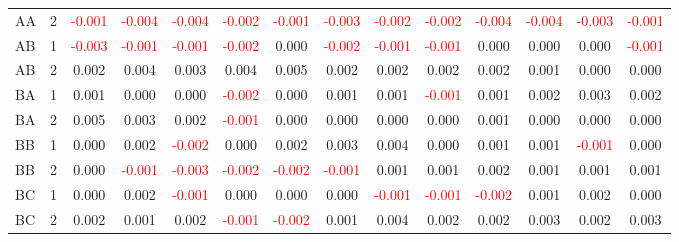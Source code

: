 \begin{table}[H]
{\begin{tabular}{llcccccccccccc}
AA & 2 & \textcolor{red}{-0.001} & \textcolor{red}{-0.004} & \textcolor{red}{-0.004} & \textcolor{red}{-0.002} & \textcolor{red}{-0.001} & \textcolor{red}{-0.003} & \textcolor{red}{-0.002} & \textcolor{red}{-0.002} & \textcolor{red}{-0.004} & \textcolor{red}{-0.004} & \textcolor{red}{-0.003} & \textcolor{red}{-0.001}\\
AB & 1 & \textcolor{red}{-0.003} & \textcolor{red}{-0.001} & \textcolor{red}{-0.001} & \textcolor{red}{-0.002} & 0.000 & \textcolor{red}{-0.002} & \textcolor{red}{-0.001} & \textcolor{red}{-0.001} & 0.000 & 0.000 & 0.000 & \textcolor{red}{-0.001}\\
AB & 2 & 0.002 & 0.004 & 0.003 & 0.004 & 0.005 & 0.002 & 0.002 & 0.002 & 0.002 & 0.001 & 0.000 & 0.000\\
BA & 1 & 0.001 & 0.000 & 0.000 & \textcolor{red}{-0.002} & 0.000 & 0.001 & 0.001 & \textcolor{red}{-0.001} & 0.001 & 0.002 & 0.003 & 0.002\\
BA & 2 & 0.005 & 0.003 & 0.002 & \textcolor{red}{-0.001} & 0.000 & 0.000 & 0.000 & 0.000 & 0.001 & 0.000 & 0.000 & 0.000\\
BB & 1 & 0.000 & 0.002 & \textcolor{red}{-0.002} & 0.000 & 0.002 & 0.003 & 0.004 & 0.000 & 0.001 & 0.001 & \textcolor{red}{-0.001} & 0.000\\
BB & 2 & 0.000 & \textcolor{red}{-0.001} & \textcolor{red}{-0.003} & \textcolor{red}{-0.002} & \textcolor{red}{-0.002} & \textcolor{red}{-0.001} & 0.001 & 0.001 & 0.002 & 0.001 & 0.001 & 0.001\\
BC & 1 & 0.000 & 0.002 & \textcolor{red}{-0.001} & 0.000 & 0.000 & 0.000 & \textcolor{red}{-0.001} & \textcolor{red}{-0.001} & \textcolor{red}{-0.002} & 0.001 & 0.002 & 0.000\\
BC & 2 & 0.002 & 0.001 & 0.002 & \textcolor{red}{-0.001} & \textcolor{red}{-0.002} & 0.001 & 0.004 & 0.002 & 0.002 & 0.003 & 0.002 & 0.003\\
\hline
    \end{tabular}%
    }
    \label{tab:cen4_uni}
\end{table}


